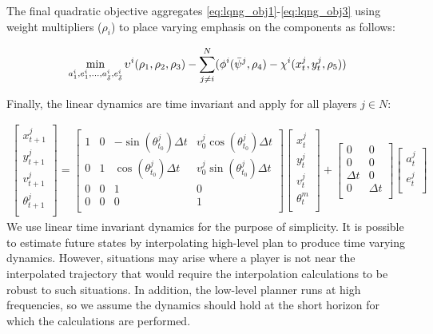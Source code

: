 The final quadratic objective aggregates \eqref{eq:lqng_obj1}-\eqref{eq:lqng_obj3} using weight multipliers ($\rho_i$) to place varying emphasis on the components as follows:

\begin{equation} \label{eq:lqng_obj}
    \min_{a^i_{1}, e^i_{1}, ..., a^i_{\Bar{\delta}}, e^i_{\Bar{\delta}}}
    \upsilon^i(\rho_1, \rho_2,\rho_3)
    -\sum_{j \neq i}^{N}  (\phi^i(\Bar{\psi}^j, \rho_4) - \chi^i(x^j_t, y^j_t, \rho_5))
\end{equation}

Finally, the linear dynamics are time invariant and apply for all players $j \in N$:

\begin{multline} \label{eq:lqng_dyn}
\begin{bmatrix}
x^j_{t+1} \\
y^j_{t+1} \\
v^j_{t+1} \\
\theta^j_{t+1} \\
\end{bmatrix} = 
\begin{bmatrix} 
	1 & 0 & -\sin(\theta^j_{t_0})\Delta t & v^j_0\cos(\theta^j_{t_0})\Delta t\\
	0 & 1 & \cos(\theta^j_{t_0})\Delta t & v^j_0\sin(\theta^j_{t_0})\Delta t\\
	0 & 0 & 1 & 0\\
	0 & 0 & 0 & 1\\
	\end{bmatrix}
\begin{bmatrix}
x^j_{t} \\
y^j_{t} \\
v^j_{t} \\
\theta^m_{t} \\
\end{bmatrix}  +
\begin{bmatrix} 
	0 & 0 \\
	0 & 0 \\
	\Delta t & 0 \\
	0 & \Delta t \\
	\end{bmatrix}
	\begin{bmatrix} 
	a^j_t  \\
	e^j_t \\
	\end{bmatrix}
\end{multline}
We use linear time invariant dynamics for the purpose of simplicity. It is possible to estimate future states by interpolating high-level plan to produce time varying dynamics. However, situations may arise where a player is not near the interpolated trajectory that would require the interpolation calculations to be robust to such situations. In addition, the low-level planner runs at high frequencies, so we assume the dynamics should hold at the short horizon for which the calculations are performed.  
